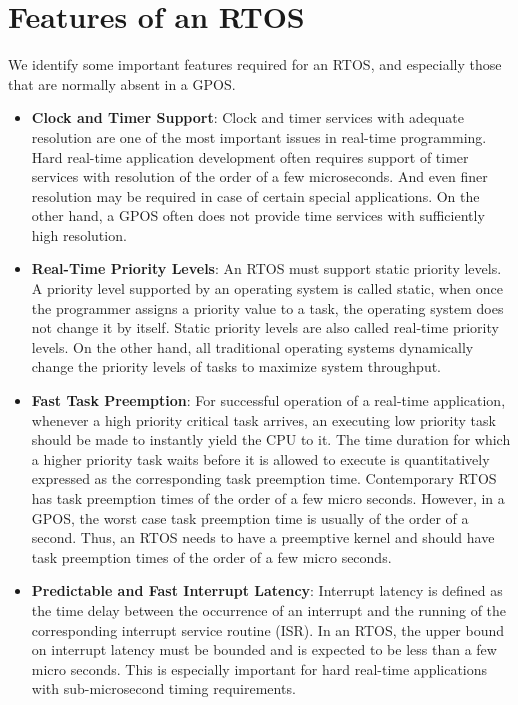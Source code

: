 \documentclass[12pt]{report}
\begin{document}
\section{Features of an RTOS}
We identify some important features required for an RTOS, and especially those that are normally absent in a GPOS. 
\begin{itemize}
    \item \textbf{Clock and Timer Support}: Clock and timer services with adequate resolution are one of the most important issues in real-time programming. Hard real-time application development often requires support of timer services with resolution of the order of a few microseconds. And even finer resolution may be required in case of certain special applications. On the other hand, a GPOS often does not provide time services with sufficiently high resolution. 
    \item \textbf{Real-Time Priority Levels}: An RTOS must support static priority levels. A priority level supported by an operating system is called static, when once the programmer assigns a priority value to a task, the operating system does not change it by itself. Static priority levels are also called real-time priority levels. On the other hand, all traditional operating systems dynamically change the priority levels of tasks to maximize system throughput. 
    \item \textbf{Fast Task Preemption}: For successful operation of a real-time application, whenever a high priority critical task arrives, an executing low priority task should be made to instantly yield the CPU to it. The time duration for which a higher priority task waits before it is allowed to execute is quantitatively expressed as the corresponding task preemption time. Contemporary RTOS has task preemption times of the order of a few micro seconds. However, in a GPOS, the worst case task preemption time is usually of the order of a second. Thus, an RTOS needs to have a preemptive kernel and should have task preemption times of the order of a few micro seconds. 
    \item \textbf{Predictable and Fast Interrupt Latency}: Interrupt latency is defined as the time delay between the occurrence of an interrupt and the running of the corresponding interrupt service routine (ISR). In an RTOS, the upper bound on interrupt latency must be bounded and is expected to be less than a few micro seconds. This is especially important for hard real-time applications with sub-microsecond timing requirements. 
\end{itemize}
\end{document}
